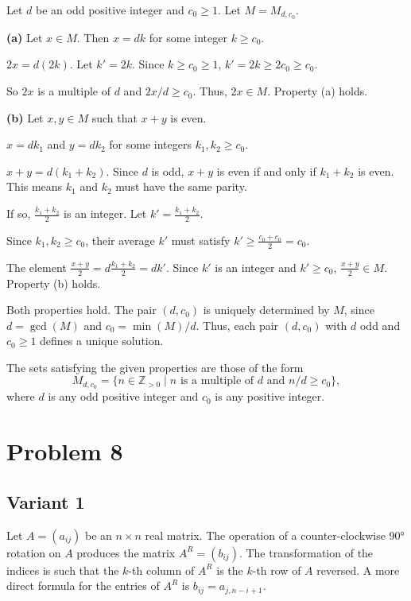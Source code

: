 \documentclass[12pt,a4paper]{article}
\theoremstyle{definition}
\begin{document}
        Let $d$ be an odd positive integer and $c_0 \geq 1$. Let $M = M_{d,c_0}$.

        \textbf{(a)} Let $x \in M$. Then $x=dk$ for some integer $k \geq c_0$.

        $2x = d(2k)$. Let $k' = 2k$. Since $k \geq c_0 \geq 1$, $k' = 2k \geq 2c_0 \geq c_0$.

        So $2x$ is a multiple of $d$ and $2x/d \geq c_0$. Thus, $2x \in M$. Property (a) holds.

        \textbf{(b)} Let $x, y \in M$ such that $x+y$ is even.

        $x=dk_1$ and $y=dk_2$ for some integers $k_1, k_2 \geq c_0$.

        $x+y = d(k_1+k_2)$. Since $d$ is odd, $x+y$ is even if and only if $k_1+k_2$ is even. This means $k_1$ and $k_2$ must have the same parity.

        If so, $\frac{k_1+k_2}{2}$ is an integer. Let $k' = \frac{k_1+k_2}{2}$.

        Since $k_1, k_2 \geq c_0$, their average $k'$ must satisfy $k' \geq \frac{c_0+c_0}{2} = c_0$.

        The element $\frac{x+y}{2} = d\frac{k_1+k_2}{2} = dk'$. Since $k'$ is an integer and $k' \geq c_0$, $\frac{x+y}{2} \in M$. Property (b) holds.

        Both properties hold. The pair $(d, c_0)$ is uniquely determined by $M$, since $d=\gcd(M)$ and $c_0 = \min(M)/d$. Thus, each pair $(d,c_0)$ with $d$ odd and $c_0 \geq 1$ defines a unique solution.

        The sets satisfying the given properties are those of the form
        $$M_{d,c_0} = \{n \in \mathbb{Z}_{>0} \mid n \text{ is a multiple of } d \text{ and } n/d \geq c_0\},$$
        where $d$ is any odd positive integer and $c_0$ is any positive integer.

\section{Problem 8}


    \subsection{Variant 1}
        Let $A = (a_{ij})$ be an $n \times n$ real matrix. The operation of a counter-clockwise $90°$ rotation on $A$ produces the matrix $A^R = (b_{ij})$. The transformation of the indices is such that the $k$-th column of $A^R$ is the $k$-th row of $A$ reversed. A more direct formula for the entries of $A^R$ is $b_{ij} = a_{j, n-i+1}$.
\end{document}

